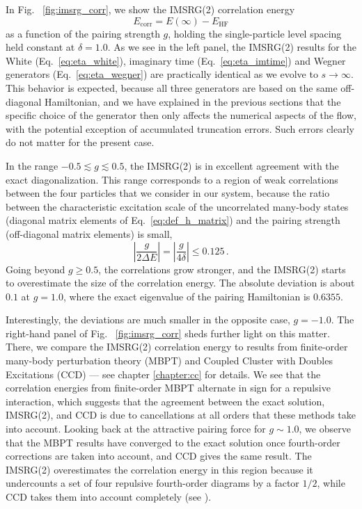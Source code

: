 {In Fig.~ \ref{fig:imsrg_corr}, we show the IMSRG(2) correlation energy
\begin{equation}
  E_\text{corr} = E(\infty) - E_\text{HF}
\end{equation}
as a function of the pairing strength $g$, holding the single-particle 
level spacing held constant at $\delta=1.0$. As we see in the left panel, 
the IMSRG(2) results for the White (Eq.~\eqref{eq:eta_white}), imaginary
time (Eq.~\eqref{eq:eta_imtime}) and Wegner generators (Eq.~\eqref{eq:eta_wegner})
are practically identical as we evolve to $s\to\infty$. This behavior
is expected, because all three generators are based on the same off-diagonal
Hamiltonian, and we have explained in the previous sections that the 
specific choice of the generator then only affects the numerical aspects
of the flow, with the potential exception of accumulated truncation
errors. Such errors clearly do not matter for the present case.

In the range $-0.5\lesssim g \lesssim 0.5$, the IMSRG(2) is in excellent 
agreement with the exact diagonalization. This range corresponds to 
a region of weak correlations between the four particles that we 
consider in our system, because the ratio between the characteristic excitation
scale of the uncorrelated many-body states (diagonal matrix elements of 
Eq.~\eqref{eq:def_h_matrix}) and the pairing strength (off-diagonal matrix 
elements) is small,
\begin{equation}
  \left|\frac{g}{2\Delta E}\right| = \left|\frac{g}{4\delta}\right| \leq 0.125\,.
\end{equation}
Going beyond $g\geq 0.5$, the correlations grow stronger, and the IMSRG(2) 
starts to overestimate the size of the correlation energy. The absolute 
deviation is about $0.1$ at $g=1.0$, where the exact eigenvalue of the pairing 
Hamiltonian is $0.6355$. 

Interestingly, the deviations are much smaller in the opposite case, $g=-1.0$. The 
right-hand panel of Fig.~ \ref{fig:imsrg_corr} sheds further light on this matter.
There, we compare the IMSRG(2) correlation energy to results from finite-order
many-body perturbation theory (MBPT) and Coupled Cluster with Doubles Excitations
(CCD) --- see chapter \ref{chapter:cc} for details. We see that the correlation
energies from finite-order MBPT alternate in sign for a repulsive interaction,
which suggests that the agreement between the exact solution, IMSRG(2), and CCD
is due to cancellations at all orders that these methods take into account.
Looking back at the attractive pairing force for $g\sim1.0$, we observe that 
the MBPT results have converged to the exact solution once fourth-order 
corrections are taken into account, and CCD gives the same result. The
IMSRG(2) overestimates the correlation energy in this region because it 
undercounts a set of four repulsive fourth-order diagrams by a factor $1/2$,
while CCD takes them into account completely 
(see \cite{Hergert:2016jk,Parzuchowski:2016pi}).

}
